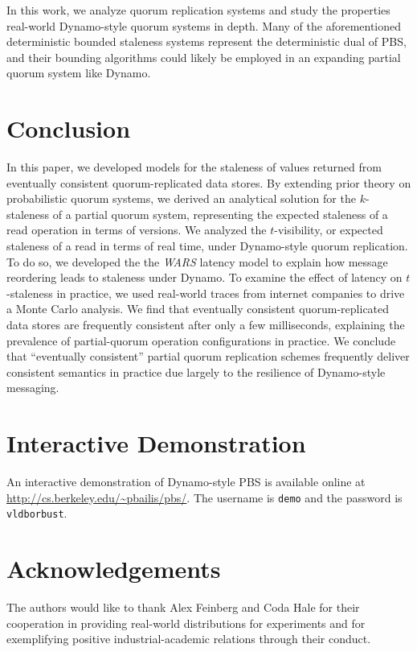 \documentclass{vldb}
\newcommand{\sectionskip}{-0em}
\begin{document}
In this work, we analyze quorum replication systems and study the
properties real-world Dynamo-style quorum systems in depth.  Many of
the aforementioned deterministic bounded staleness systems represent the
deterministic dual of PBS, and their bounding algorithms could likely
be employed in an expanding partial quorum system like Dynamo.

\vspace{\sectionskip}\section{Conclusion}
\label{sec:conclusion}

In this paper, we developed models for the staleness of values
returned from eventually consistent quorum-replicated data stores.  By
extending prior theory on probabilistic quorum systems, we derived an
analytical solution for the $k$-staleness of a partial quorum system,
representing the expected staleness of a read operation in terms of
versions.  We analyzed the $t$-visibility, or expected staleness of a
read in terms of real time, under Dynamo-style quorum replication.  To
do so, we developed the the \textit{WARS} latency model to explain how
message reordering leads to staleness under Dynamo.  To examine the
effect of latency on $t$-staleness in practice, we used real-world
traces from internet companies to drive a Monte Carlo analysis.  We
find that eventually consistent quorum-replicated data stores are
frequently consistent after only a few milliseconds, explaining the
prevalence of partial-quorum operation configurations in practice.  We
conclude that ``eventually consistent'' partial quorum replication
schemes frequently deliver consistent semantics in practice due largely to the
resilience of Dynamo-style messaging.

\section*{Interactive Demonstration}

An interactive demonstration of Dynamo-style PBS is available online at \url{http://cs.berkeley.edu/~pbailis/pbs/}.  The username is \texttt{demo} and the password is \texttt{vldborbust}.

\section*{Acknowledgements}

The authors would like to thank Alex Feinberg and Coda Hale for their
cooperation in providing real-world distributions for experiments and for
exemplifying positive industrial-academic relations through their conduct.
\end{document}
